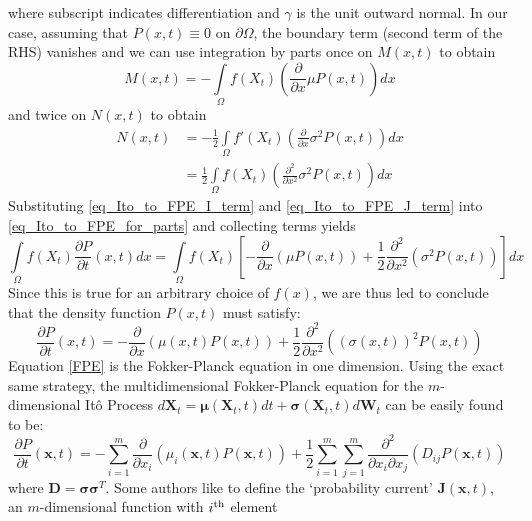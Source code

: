 where subscript indicates differentiation and $\gamma$ is the unit outward normal. In our case, assuming that $P(x,t) \equiv 0$ on $\partial \Omega$, the boundary term (second term of the RHS) vanishes and we can use integration by parts once on $M(x,t)$ to obtain
\begin{equation}
\label{eq_Ito_to_FPE_I_term}
    M(x,t) = - \int\limits_{\Omega}f(X_t)\left(\frac{\partial}{\partial x}\mu P(x,t)\right)dx
\end{equation}
and twice on $N(x,t)$ to obtain
\begin{align}
    N(x,t) &= - \frac{1}{2}\int\limits_{\Omega}f'(X_t)\left(\frac{\partial}{\partial x}\sigma^2 P(x,t)\right)dx\nonumber\\
    &= \frac{1}{2}\int\limits_{\Omega}f(X_t)\left(\frac{\partial^2}{\partial x^2}\sigma^2 P(x,t)\right)dx\label{eq_Ito_to_FPE_J_term}
\end{align}
Substituting \eqref{eq_Ito_to_FPE_I_term} and \eqref{eq_Ito_to_FPE_J_term} into \eqref{eq_Ito_to_FPE_for_parts} and collecting terms yields
\begin{equation*}
    \int\limits_{\Omega}f(X_t)\frac{\partial P}{\partial t}(x,t)dx = \int\limits_{\Omega}f(X_t)\left[-\frac{\partial}{\partial x}(\mu P(x,t)) + \frac{1}{2}\frac{\partial^2}{\partial x^2}(\sigma^2P(x,t))\right]dx
\end{equation*}
Since this is true for an arbitrary choice of $f(x)$, we are thus led to conclude that the density function $P(x,t)$ must satisfy:
\begin{equation}
\label{FPE}
\frac{\partial P}{\partial t}(x,t) =-\frac{\partial}{\partial x}\left(\mu(x,t) P(x,t)\right) + \frac{1}{2}\frac{\partial^2}{\partial x^2}\left((\sigma(x,t))^2P(x,t)\right)
\end{equation}
Equation \eqref{FPE} is the Fokker-Planck equation in one dimension. Using the exact same strategy, the multidimensional Fokker-Planck equation for the $m$-dimensional It\^{o} Process $d\mathbf{X}_t = \boldsymbol{\mu}(\mathbf{X}_t,t)dt + \boldsymbol{\sigma}(\mathbf{X}_t,t)d\mathbf{W}_t$ can be easily found to be:
\begin{equation}
\label{app_FPE_ndim}
\frac{\partial P}{\partial t}(\mathbf{x},t) =-\sum\limits_{i=1}^{m}\frac{\partial}{\partial x_i}\left(\mu_i(\mathbf{x},t) P(\mathbf{x},t)\right) + \frac{1}{2}\sum\limits_{i=1}^{m}\sum\limits_{j=1}^{m}\frac{\partial^2}{\partial x_i \partial x_j}\left(D_{ij}P(\mathbf{x},t)\right)
\end{equation}
where $\mathbf{D} = \mathbf{\sigma}\mathbf{\sigma}^T$. Some authors like to define the `probability current' $\mathbf{J}(\mathbf{x},t)$, an $m$-dimensional function with $i\textsuperscript{th}$ element

